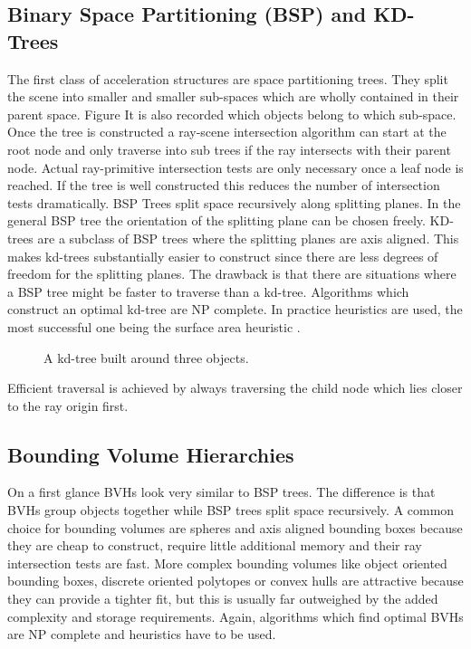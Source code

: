 \documentclass{ACGSeminar}
\begin{document}
\subsection{Binary Space Partitioning (BSP) and KD-Trees}
The first class of acceleration structures are space partitioning trees. They split the scene into smaller and smaller sub-spaces which are wholly contained in their parent space. Figure  It is also recorded which objects belong to which sub-space. Once the tree is constructed a ray-scene intersection algorithm can start at the root node and only traverse into sub trees if the ray intersects with their parent node. Actual ray-primitive intersection tests are only necessary once a leaf node is reached. If the tree is well constructed this reduces the number of intersection tests dramatically.
BSP Trees split space recursively along splitting planes. In the general BSP tree the orientation of the splitting plane can be chosen freely. KD-trees are a subclass of BSP trees where the splitting planes are axis aligned. This makes kd-trees substantially easier to construct since there are less degrees of freedom for the splitting planes. The drawback is that there are situations where a BSP tree might be faster to traverse than a kd-tree.
Algorithms which construct an optimal kd-tree are NP complete. In practice heuristics are used, the most successful one being the surface area heuristic \cite{MacDonald1990}.

\begin{figure}[htb!]
  \centering
  
  \caption{A kd-tree built around three objects.}
  \label{fig:kd-tree}
\end{figure}

Efficient traversal is achieved by always traversing the child node which lies closer to the ray origin first.

\subsection{Bounding Volume Hierarchies}
On a first glance BVHs look very similar to BSP trees. The difference is that BVHs group objects together while BSP trees split space recursively. A common choice for bounding volumes are spheres and axis aligned bounding boxes because they are cheap to construct, require little additional memory and their ray intersection tests are fast. More complex bounding volumes like object oriented bounding boxes, discrete oriented polytopes or convex hulls are attractive because they can provide a tighter fit, but this is usually far outweighed by the added complexity and storage requirements.
Again, algorithms which find optimal BVHs are NP complete and heuristics have to be used.
\end{document}

